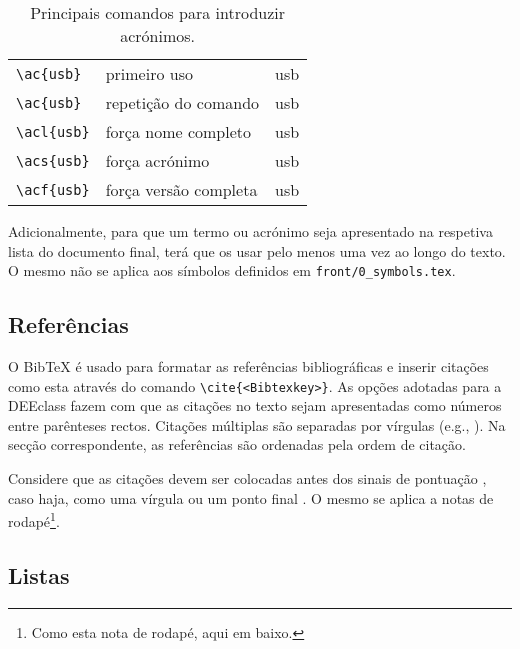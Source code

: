\begin{table}[htb]
	\caption{Principais comandos para introduzir acrónimos.}
	\label{tab:acros}
	\centering
	\begin{tabular}{l l l}
	\toprule
	\tabhead{Comando} & \tabhead{} & \tabhead{Resultado} \\
	\midrule
		\verb|\ac{usb}| & primeiro uso & \ac{usb}\\
		\verb|\ac{usb}| & repetição do comando & \ac{usb}\\
		\verb|\acl{usb}| & força nome completo & \acl{usb}\\
		\verb|\acs{usb}| & força acrónimo & \acs{usb}\\
		\verb|\acf{usb}| & força versão completa & \acf{usb}\\
	\bottomrule
	\end{tabular}
\end{table}

Adicionalmente, para que um termo ou acrónimo seja apresentado na respetiva lista do documento final, terá que os usar pelo menos uma vez ao longo do texto. O mesmo não se aplica aos símbolos definidos em \verb|front/0_symbols.tex|.


\subsection{Referências}

O BibTeX é usado para formatar as referências bibliográficas e inserir citações como esta \cite{W3C05} através do comando \verb|\cite{<Bibtexkey>}|. As opções adotadas para a DEEclass fazem com que as citações no texto sejam apresentadas como números entre parênteses rectos. Citações múltiplas são separadas por vírgulas (e.g., \cite{Lipsum08, Li00, Candy92}). Na secção correspondente, as referências são ordenadas pela ordem de citação. 

Considere que as citações \cite{Motorola96} devem ser colocadas antes dos sinais de pontuação \cite{Jain87}, caso haja, como uma vírgula ou um ponto final \cite{Delorme95}. O mesmo se aplica a notas de rodapé\footnote{Como esta nota de rodapé, aqui em baixo.}.


\subsection{Listas}

